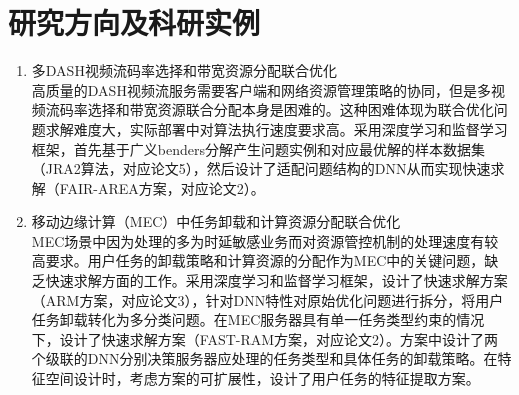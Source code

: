 \documentclass{resume}
\begin{document}
\section{研究方向及科研实例}
\begin{enumerate}
  \item 多DASH视频流码率选择和带宽资源分配联合优化
  \\ 高质量的DASH视频流服务需要客户端和网络资源管理策略的协同，但是多视频流码率选择和带宽资源联合分配本身是困难的。这种困难体现为联合优化问题求解难度大，实际部署中对算法执行速度要求高。采用深度学习和监督学习框架，首先基于广义benders分解产生问题实例和对应最优解的样本数据集（JRA2算法，对应论文5），然后设计了适配问题结构的DNN从而实现快速求解（FAIR-AREA方案，对应论文2）。
  \item 移动边缘计算（MEC）中任务卸载和计算资源分配联合优化
  \\ MEC场景中因为处理的多为时延敏感业务而对资源管控机制的处理速度有较高要求。用户任务的卸载策略和计算资源的分配作为MEC中的关键问题，缺乏快速求解方面的工作。采用深度学习和监督学习框架，设计了快速求解方案（ARM方案，对应论文3），针对DNN特性对原始优化问题进行拆分，将用户任务卸载转化为多分类问题。在MEC服务器具有单一任务类型约束的情况下，设计了快速求解方案（FAST-RAM方案，对应论文2）。方案中设计了两个级联的DNN分别决策服务器应处理的任务类型和具体任务的卸载策略。在特征空间设计时，考虑方案的可扩展性，设计了用户任务的特征提取方案。
\end{enumerate}
\end{document}
